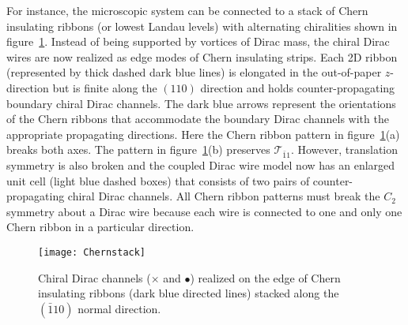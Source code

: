 For instance, the microscopic system can be connected to a stack of Chern insulating ribbons (or lowest Landau levels) with alternating chiralities shown in figure~\ref{fig:Chernstack}. Instead of being supported by vortices of Dirac mass, the chiral Dirac wires are now realized as edge modes of Chern insulating strips. Each 2D ribbon (represented by thick dashed dark blue lines) is elongated in the out-of-paper $z$-direction but is finite along the $(110)$ direction and holds counter-propagating boundary chiral Dirac channels. The dark blue arrows represent the orientations of the Chern ribbons that accommodate the boundary Dirac channels with the appropriate propagating directions. Here the Chern ribbon pattern in figure~\ref{fig:Chernstack}(a) breaks both \AFTR axes. The pattern in figure~\ref{fig:Chernstack}(b) preserves $\mathcal{T}_{\bar{1}1}$. However, translation symmetry is also broken and the coupled Dirac wire model now has an enlarged unit cell (light blue dashed boxes) that consists of two pairs of counter-propagating chiral Dirac channels. All Chern ribbon patterns must break the $C_2$ symmetry about a Dirac wire because each wire is connected to one and only one Chern ribbon in a particular direction.

\begin{figure}[htbp]
\centering\texttt{[image: Chernstack]}
\caption{Chiral Dirac channels ({\color{red}$\boldsymbol\times$} and {\color{green}$\bullet$}) realized on the edge of Chern insulating ribbons (dark blue directed lines) stacked along the $(\bar{1}10)$ normal direction.}\label{fig:Chernstack}
\end{figure}

